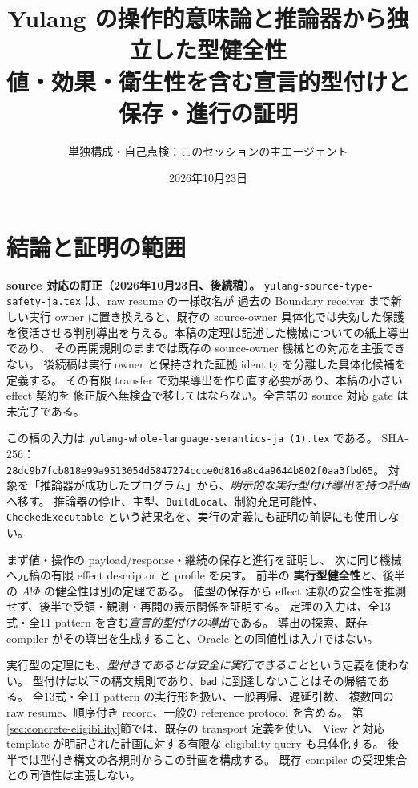 \documentclass[11pt,a4paper]{article}
\title{Yulang の操作的意味論と推論器から独立した型健全性\\
\large 値・効果・衛生性を含む宣言的型付けと保存・進行の証明}
\author{単独構成・自己点検：このセッションの主エージェント}
\date{2026年10月23日}
\newcommand{\Bad}{\mathsf{bad}}
\begin{document}
\maketitle

\section*{結論と証明の範囲}

\textbf{source 対応の訂正（2026年10月23日、後続稿）。}
\nolinkurl{yulang-source-type-safety-ja.tex} は、raw resume の一様改名が
過去の Boundary receiver まで新しい実行 owner に置き換えると、既存の source-owner
具体化では失効した保護を復活させる判別導出を与える。本稿の定理は記述した機械についての紙上導出であり、
その再開規則のままでは既存の source-owner 機械との対応を主張できない。
後続稿は実行 owner と保持された証拠 identity を分離した具体化候補を定義する。
その有限 transfer で効果導出を作り直す必要があり、本稿の小さい effect 契約を
修正版へ無検査で移してはならない。全言語の source 対応 gate は未完了である。

この稿の入力は \nolinkurl{yulang-whole-language-semantics-ja (1).tex} である。
SHA-256：\nolinkurl{28dc9b7fcb818e99a9513054d5847274ccce0d816a8c4a9644b802f0aa3fbd65}。
対象を「推論器が成功したプログラム」から、\emph{明示的な実行型付け導出を持つ計画}へ移す。
推論器の停止、主型、\texttt{BuildLocal}、制約充足可能性、
\texttt{CheckedExecutable} という結果名を、実行の定義にも証明の前提にも使用しない。

まず値・操作の payload/response・継続の保存と進行を証明し、
次に同じ機械へ元稿の有限 effect descriptor と profile を戻す。
前半の \textbf{実行型健全性}と、後半の \(A!\Phi\) の健全性は別の定理である。
値型の保存から effect 注釈の安全性を推測せず、後半で受領・観測・再開の表示関係を証明する。
定理の入力は、全13式・全11 pattern を含む\emph{宣言的型付けの導出}である。
導出の探索、既存 compiler がその導出を生成すること、Oracle との同値性は入力ではない。

実行型の定理にも、\emph{型付きであるとは安全に実行できること}という定義を使わない。
型付けは以下の構文規則であり、\(\Bad\) に到達しないことはその帰結である。
全13式・全11 pattern の実行形を扱い、一般再帰、遅延引数、
複数回の raw resume、順序付き record、一般の reference protocol を含める。
第\ref{sec:concrete-eligibility}節では、既存の transport 定義を使い、
View と対応 template が明記された計画に対する有限な eligibility query も具体化する。
後半では型付き構文の各規則からこの計画を構成する。
既存 compiler の受理集合との同値性は主張しない。
\end{document}

